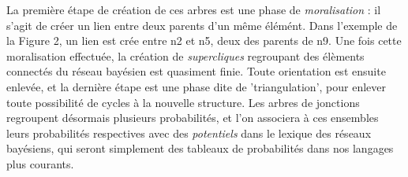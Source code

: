 \documentclass[a4paper]{article}
\begin{document}
\par \medbreak 
La première étape de création de ces arbres est une phase de \textit{moralisation} : il s'agit de créer un lien entre deux parents d'un même élémént. Dans l'exemple de la Figure 2, un lien est crée entre n2 et n5, 
deux des parents de n9. Une fois cette moralisation effectuée, la création de \textit{supercliques} regroupant des élèments connectés du réseau bayésien est quasiment finie. Toute orientation est ensuite enlevée, et la dernière
étape est une phase dite de 'triangulation', pour enlever toute possibilité de cycles à la nouvelle structure. Les arbres de jonctions regroupent désormais plusieurs probabilités, et l'on associera à ces ensembles 
leurs probabilités respectives avec des \textit{potentiels} dans le lexique des réseaux bayésiens, qui seront simplement des tableaux de probabilités dans nos langages plus courants.
\end{document}
